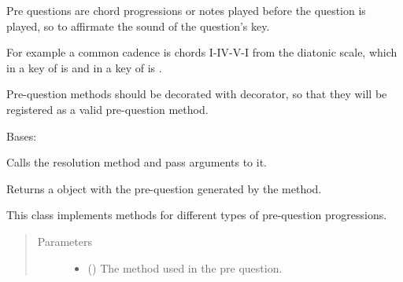 \documentclass[letterpaper,10pt,english]{sphinxmanual}
\begin{document}
Pre questions are chord progressions or notes played before the question is
played, so to affirmate the sound of the question’s key.

For example a common cadence is chords I-IV-V-I from the diatonic scale, which
in a key of  is  and in a key of  is .

Pre-question methods should be decorated with 
decorator, so that they will be registered as a valid pre-question method.

\begin{fulllineitems}
\label{\detokenize{index:birdears.prequestion.PreQuestion}}
Bases: 

\begin{fulllineitems}
\label{\detokenize{index:birdears.prequestion.PreQuestion.__call__}}
Calls the resolution method and pass arguments to it.

Returns a  object with the pre-question generated by
the method.

\end{fulllineitems}


\begin{fulllineitems}
\label{\detokenize{index:birdears.prequestion.PreQuestion.__init__}}
This class implements methods for different types of pre-question
progressions.
\begin{quote}\begin{description}
\item[{Parameters}] \leavevmode\begin{itemize}
\item {} 
 () \textendash{} The method used in the pre question.


\end{itemize}
\end{description}
\end{quote}
\end{fulllineitems}
\end{fulllineitems}
\end{document}
